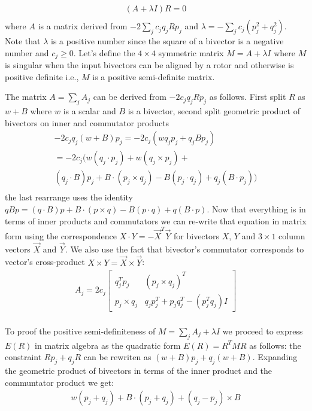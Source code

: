 \documentclass{birkjour}
\numberwithin{equation}{section}
\begin{document}
\begin{eqnarray}
	(A  + \lambda I) R = 0 \nonumber\\
\end{eqnarray}
where $A$ is a matrix derived from $-2 \sum_j { c_{j} q_j R p_j }$ and $\lambda = -\sum_j { c_{j} (p_j^2 + q_j^2) }$. Note that $\lambda$ is a positive number since the square of a bivector is a negative number and $c_j \geq 0$. Let's define the $4 \times 4$ symmetric matrix $M = A  + \lambda I$ where $M$ is singular when the input bivectors can be aligned by a rotor and otherwise is positive definite i.e., $M$ is a positive semi-definite matrix.

The matrix $A = \sum_j A_j$ can be derived from $-2 c_j q_j R p_j$ as follows. First split $R$ as $w + B$ where $w$ is a scalar and $B$ is a bivector, second split geometric product of bivectors on inner and commutator products
\begin{eqnarray}
	-2 c_j q_j (w + B) p_j = -2 c_j (w q_j p_j + q_j B p_j) \nonumber\\
	= -2 c_j (
		w (q_j \cdot p_j) + w (q_j \times p_j) + \nonumber\\
	   (q_j \cdot B) p_j + B \cdot (p_j \times q_j) - B (p_j \cdot q_j) + q_j (B \cdot p_j)
	) \nonumber\\
\end{eqnarray}
the last rearrange uses the identity $q B p = (q \cdot B) p + B \cdot (p \times q) - B (p \cdot q) + q (B \cdot p)$. Now that everything is in terms of inner products and commutators we can re-write that equation in matrix form using the correspondence $X \cdot Y = - \vec X^T \vec Y$ for bivectors $X$, $Y$ and $3 \times 1$ column vectors $\vec X$ and $\vec Y$. We also use the fact that bivector's commutator corresponds to vector's cross-product $X \times Y = \vec X \times \vec Y$:
\begin{eqnarray}
	A_j = 2 c_j 
	\left[\begin{array}{cc} 
		q_j^T p_j  & (p_j \times q_j)^T  \\
		p_j \times q_j & q_j p_j^T + p_j q_j^T - (p_j^T q_j) I
	\end{array}\right] \\
\end{eqnarray}

To proof the positive semi-definiteness of $M = \sum_j A_j + \lambda I$ we proceed to express $E(R)$ in matrix algebra as the quadratic form $E(R) = R^T M R$ as follows: the constraint $R p_j + q_j R$ can be rewriten as $(w + B) p_j  + q_j (w + B)$. Expanding the geometric product of bivectors in terms of the inner product and the communtator product we get:
\begin{eqnarray}
	w  (p_j + q_j) + B \cdot (p_j + q_j)  + (q_j - p_j) \times B
\end{eqnarray}
\end{document}
